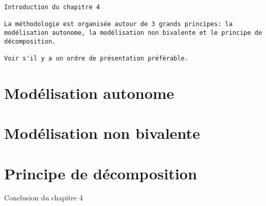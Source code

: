 %

\chaptertoc{}


\begin{verbatim}
Introduction du chapitre 4

La méthodologie est organisée autour de 3 grands principes: la
modélisation autonome, la modélisation non bivalente et le principe de
décomposition. 

Voir s'il y a un ordre de présentation préférable.
\end{verbatim}


\section{Modélisation autonome}
\label{sec:4-1}

\section{Modélisation non bivalente}
\label{sec:4-2}

\section{Principe de décomposition}
\label{sec:4-3}


Conclusion du chapitre 4

